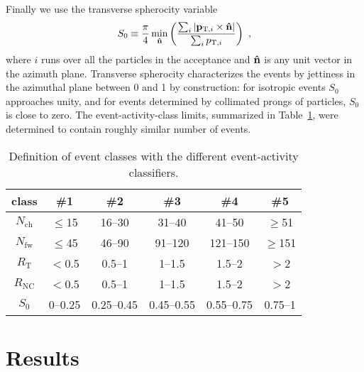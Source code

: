 \documentclass[aps,amsmath,amssymb,a4paper,11pt,superscriptaddress]{revtex4-2}
\newcommand*{\Nch}{\ensuremath{N_\mathrm{ch}}\xspace}
\newcommand*{\Nfw}{\ensuremath{N_\mathrm{fw}}\xspace}
\newcommand*{\RT}{\ensuremath{R_\mathrm{T}}\xspace}
\newcommand*{\RNC}{\ensuremath{R_\mathrm{NC}}\xspace}
\newcommand*{\SO}{\ensuremath{S_\mathrm{0}}\xspace}
\begin{document}
Finally we use the transverse spherocity variable~\cite{Ortiz:2015ttf} 
\begin{eqnarray}
\SO \equiv \frac{\pi}{4} \min\limits_{\bf \hat{n}} \left( \frac{\sum_i \left| {\bf p}_{{\rm T},i} \times {\bf \hat{n}} \right| }{\sum_i p_{{\rm T},i}} \right)\ , 
\end{eqnarray} 
where $i$ runs over all the particles in the acceptance and ${\bf \hat{n}}$ is any unit vector in the azimuth plane. Transverse spherocity characterizes the events by jettiness in the azimuthal plane between 0 and 1 by construction: for isotropic events \SO approaches unity, and for events determined by collimated prongs of particles, \SO is close to zero.
The event-activity-class limits, summarized in Table~\ref{tab:class}, were determined to contain roughly similar number of events.

\begin{table}[h]
\begin{center}
\begin{tabular}{ |c|c|c|c|c|c| } 
 \hline
 class & \#1 & \#2 & \#3 & \#4 & \#5 \\
 \hline\hline 
 \Nch & $\le$15 & 16--30 & 31--40 & 41--50 & $\ge$51 \\
 \Nfw & $\le$45 & 46--90 & 91--120 & 121--150 & $\ge$151 \\
 \RT & $<$0.5 & 0.5--1 & 1--1.5 & 1.5--2 & $>$2 \\
 \RNC & $<$0.5 & 0.5--1 & 1--1.5 & 1.5--2 & $>$2 \\
 \SO & 0--0.25 & 0.25--0.45 & 0.45--0.55 & 0.55--0.75 & 0.75--1 \\
 \hline
\end{tabular}
\caption{\label{tab:class}Definition of event classes with the different event-activity classifiers.}
\end{center}
\end{table}

\section{Results}
\label{sec:results}
\end{document}
